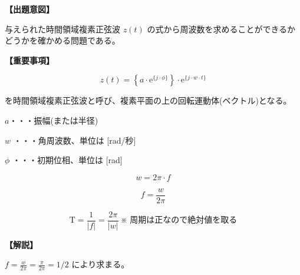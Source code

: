 \noindent \textbf{【出題意図】}

\bigskip
\noindent 与えられた時間領域複素正弦波 $z(t)$ の式から周波数を求めることができるかどうかを確かめる問題である。

\vspace{1em}
\noindent \textbf{【重要事項】}

\[
z(t) =  \left \{ a \cdot \textrm{e}^{\{j \cdot \phi\}} \right \} 
\cdot \textrm{e}^{\{j \cdot w \cdot t \}}
\]

\bigskip
\noindent を時間領域複素正弦波と呼び、複素平面の上の回転運動体(ベクトル)となる。

\bigskip
\noindent\quad  $a$・・・振幅(または半径)

\bigskip
\noindent\quad $w$ ・・・角周波数、単位は [rad/秒]

\bigskip
\noindent\quad $\phi$ ・・・初期位相、単位は [rad]

\[
w = 2\pi \cdot f
\]

\[
f = \frac{w}{2\pi} 
\]

\[
\textrm{T} = \frac{1}{|f|} = \frac{2\pi}{|w|}   \ \mbox{※ 周期は正なので絶対値を取る}
\]

\bigskip

\vspace{1em}
\noindent \textbf{【解説】}

\bigskip
\noindent $f = \frac{w}{2\pi} = \frac{\pi}{2\pi} = 1/2$ により求まる。

